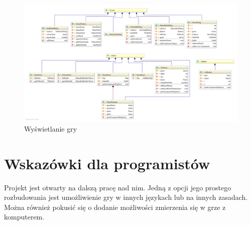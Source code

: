 \documentclass[a4paper]{article}
\begin{document}
\begin{figure}[!hb]
\centering
\includegraphics[width=\textwidth]{swing.png}
\caption{Wyświetlanie gry}
\end{figure}

\section{Wskazówki dla programistów}
Projekt jest otwarty na dalszą pracę nad nim. Jedną z opcji jego prostego rozbudowania jest umożliwienie gry w innych językach lub na innych zasadach. Można również pokusić się o dodanie możliwości zmierzenia się w grze z komputerem.
\end{document}
